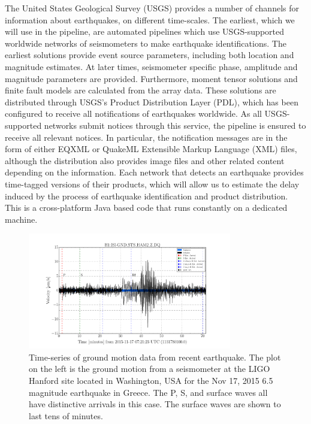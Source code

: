 \documentclass[reprint, prl, aps, showpacs]{revtex4-1}
\begin{document}
The United States Geological Survey (USGS) provides a number of channels for information about earthquakes, on different time-scales. 
The earliest, which we will use in the pipeline, are automated pipelines which use USGS-supported worldwide networks of seismometers to make earthquake identifications. 
The earliest solutions provide event source parameters, including both location and magnitude estimates.
At later times, seismometer specific phase, amplitude and magnitude parameters are provided.
Furthermore, moment tensor solutions and finite fault models are calculated from the array data.
These solutions are distributed through USGS's Product Distribution Layer (PDL), which has been configured to receive all notifications of earthquakes worldwide. 
As all USGS-supported networks submit notices through this service, the pipeline is ensured to receive all relevant notices.
In particular, the notification messages are in the form of either EQXML or QuakeML Extensible Markup Language (XML) files, although the distribution also provides image files and other related content depending on the information.
Each network that detects an earthquake provides time-tagged versions of their products, which will allow us to estimate the delay induced by the process of earthquake identification and product distribution.
This is a cross-platform Java based code that runs constantly on a dedicated machine. 

\begin{figure}[t]
\hspace*{-0.5cm}
\includegraphics[width=3.5in]{timeseries.pdf}
\caption{Time-series of ground motion data from recent earthquake. The plot on the left is the ground motion from a seismometer at the LIGO Hanford site located in Washington, USA for the Nov 17, 2015 6.5 magnitude earthquake in Greece. The P, S, and surface waves all have distinctive arrivals in this case. The surface waves are shown to last tens of minutes.}
 \label{fig:timeseries}
 \end{figure}
\end{document}
